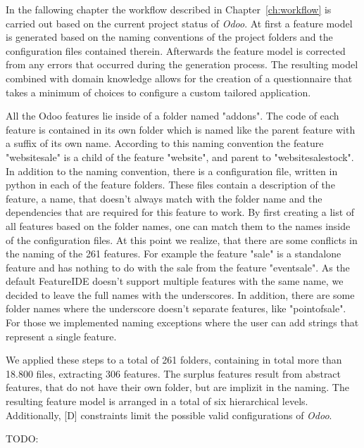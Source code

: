 In the fallowing chapter the workflow described in Chapter~\ref{ch:workflow} is carried out based on the current project status of \textit{Odoo}. At first a feature model is generated based on the naming conventions of the project folders and the configuration files contained therein. Afterwards the feature model is corrected from any errors that occurred during the generation process. The resulting model combined with domain knowledge allows for the creation of a questionnaire that takes a minimum of choices to configure a custom tailored application.

All the Odoo features lie inside of a folder named "addons". The code of each feature is contained in its own folder which is named like the parent feature with a suffix of its own name. According to this naming convention the feature "website\textunderscore sale" is a child of the feature "website", and parent to "website\textunderscore sale\textunderscore stock". In addition to the naming convention, there is a configuration file, written in python in each of the feature folders. These files contain a description of the feature, a name, that doesn't always match with the folder name and the dependencies that are required for this feature to work.
By first creating a list of all features based on the folder names, one can match them to the names inside of the configuration files. At this point we realize, that there are some conflicts in the naming of the 261 features. For example the feature "sale" is a standalone feature and has nothing to do with the sale from the feature "event\textunderscore sale". As the default FeatureIDE doesn't support multiple features with the same name, we decided to leave the full names with the underscores. In addition, there are some folder names where the underscore doesn't separate features, like "point\textunderscore of\textunderscore sale". For those we implemented naming exceptions where the user can add strings that represent a single feature.

We applied these steps to a total of 261 folders, containing in total more than 18.800 files, extracting 306 features. The surplus features result from abstract features, that do not have their own folder, but are implizit in the naming. The resulting feature model is arranged in a total of six hierarchical levels. Additionally, [D] constraints limit the possible valid configurations of \textit{Odoo}.




TODO:

